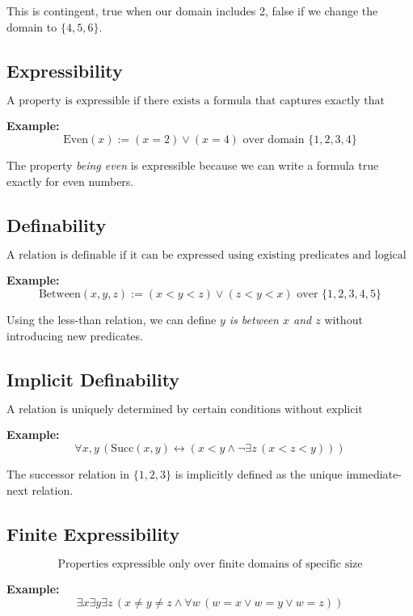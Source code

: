 \documentclass[12pt,a4paper,openany]{article}
\begin{document}
This is contingent, true when our domain includes 2, false if we change the domain to $\{4,5,6\}$.

\subsection{Expressibility}

$$\text{A property is expressible if there exists a formula that captures exactly that property}$$

\textbf{Example:} 
$$\text{Even}(x) := (x = 2) \vee (x = 4) \text{ over domain } \{1,2,3,4\}$$

The property \textit{being even} is expressible because we can write a formula true exactly for even numbers.

\subsection{Definability}

$$\text{A relation is definable if it can be expressed using existing predicates and logical operators}$$

\textbf{Example:} 
$$\text{Between}(x,y,z) := (x < y < z) \vee (z < y < x) \text{ over } \{1,2,3,4,5\}$$

Using the less-than relation, we can define \textit{$y$ is between $x$ and $z$} without introducing new predicates.

\subsection{Implicit Definability}

$$\text{A relation is uniquely determined by certain conditions without explicit construction}$$

\textbf{Example:} 
$$\forall x,y \, (\text{Succ}(x,y) \leftrightarrow (x < y \wedge \neg\exists z \, (x < z < y)))$$

The successor relation in $\{1,2,3\}$ is implicitly defined as the unique immediate-next relation.

\subsection{Finite Expressibility}

$$\text{Properties expressible only over finite domains of specific size}$$

\textbf{Example:} 
$$\exists x \exists y \exists z \, (x \neq y \neq z \wedge \forall w \, (w = x \vee w = y \vee w = z))$$
\end{document}

